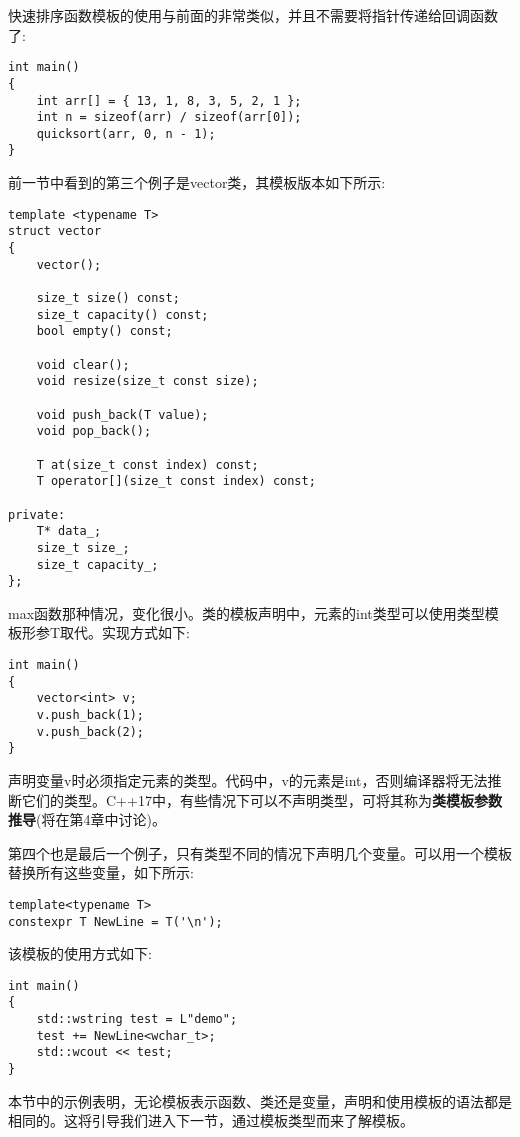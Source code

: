 快速排序函数模板的使用与前面的非常类似，并且不需要将指针传递给回调函数了:

\begin{lstlisting}[style=styleCXX]
int main()
{
	int arr[] = { 13, 1, 8, 3, 5, 2, 1 };
	int n = sizeof(arr) / sizeof(arr[0]);
	quicksort(arr, 0, n - 1);
}
\end{lstlisting}

前一节中看到的第三个例子是vector类，其模板版本如下所示:

\begin{lstlisting}[style=styleCXX]
template <typename T>
struct vector
{
	vector();
	
	size_t size() const;
	size_t capacity() const;
	bool empty() const;
	
	void clear();
	void resize(size_t const size);
	
	void push_back(T value);
	void pop_back();
	
	T at(size_t const index) const;
	T operator[](size_t const index) const;
	
private:
	T* data_;
	size_t size_;
	size_t capacity_;
};
\end{lstlisting}

max函数那种情况，变化很小。类的模板声明中，元素的int类型可以使用类型模板形参T取代。实现方式如下:

\begin{lstlisting}[style=styleCXX]
int main()
{
	vector<int> v;
	v.push_back(1);
	v.push_back(2);
}
\end{lstlisting}

声明变量v时必须指定元素的类型。代码中，v的元素是int，否则编译器将无法推断它们的类型。C++17中，有些情况下可以不声明类型，可将其称为\textbf{类模板参数推导}(将在第4章中讨论)。

第四个也是最后一个例子，只有类型不同的情况下声明几个变量。可以用一个模板替换所有这些变量，如下所示:

\begin{lstlisting}[style=styleCXX]
template<typename T>
constexpr T NewLine = T('\n');
\end{lstlisting}

该模板的使用方式如下:

\begin{lstlisting}[style=styleCXX]
int main()
{
	std::wstring test = L"demo";
	test += NewLine<wchar_t>;
	std::wcout << test;
}
\end{lstlisting}

本节中的示例表明，无论模板表示函数、类还是变量，声明和使用模板的语法都是相同的。这将引导我们进入下一节，通过模板类型而来了解模板。














